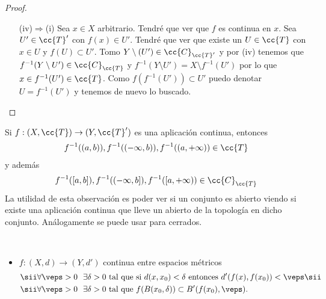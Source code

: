 \begin{prop}
\begin{proof}
\begin{enumerate}
            \item[(iv)$\Rightarrow$(i)] Sea $x\in X$ arbitrario. Tendré que ver que $f$ es continua en $x$. Sea $U'\in \cc{T}'$ con $f(x)\in U'$. Tendré que ver que existe un $U\in \cc{T}$ con $x\in U$ y $f(U)\subset U'$. Tomo $Y\setminus(U')\in \cc{C}_{\cc{T}'}$ y por (iv) tenemos que $f^{-1}(Y\setminus U')\in \cc{C}_{\cc{T}}$ y $f^{-1}(Y\setminus U') = X \setminus f^{-1}(U')$ por lo que $x\in f^{-1}(U')\in \cc{T}$. Como $f(f^{-1}(U'))\subset U'$ puedo denotar $U = f^{-1}(U')$ y tenemos de nuevo lo buscado. 
        \end{enumerate}
    \end{proof}
\end{prop}

\begin{observacion}
    Si $f: (X, \cc{T}) \to (Y, \cc{T}')$ es una aplicación continua, entonces 
    \begin{gather*}
        f^{-1}((a,b)), f^{-1}((-\infty, b)), f^{-1}((a, +\infty))\in \cc{T}
    \end{gather*}
    y además 
    \begin{gather*}
        f^{-1}([a,b]), f^{-1}((-\infty, b]), f^{-1}([a, +\infty))\in \cc{C}_{\cc{T}}
    \end{gather*}
    La utilidad de esta observación es poder ver si un conjunto es abierto viendo si existe una aplicación continua que lleve un abierto de la topología en dicho conjunto. Análogamente se puede usar para cerrados.
    \endsquare
\end{observacion}

\begin{ejemplo}\
    \begin{itemize}
        \item $f:(X, d) \to (Y, d')$ continua entre espacios métricos 
        \begin{align*}
            \sii &\forall \veps >0\ \ \exists \delta >0 \text{ tal que si } d(x, x_0)<\delta \text{ entonces } d'(f(x), f(x_0))<\veps \sii\\
            \sii &\forall \veps >0 \ \ \exists \delta >0 \text{ tal que } f(B(x_0, \delta))\subset B'(f(x_0), \veps).
        \end{align*}
    \end{itemize}
\end{ejemplo}